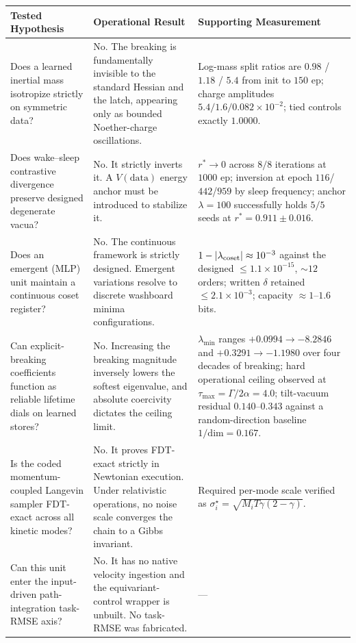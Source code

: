 \documentclass{article}
\begin{document}
\begin{center}
\begin{tabular}{@{}p{1.52in} p{1.52in} p{2.06in}@{}}
\toprule
Tested Hypothesis & Operational Result & Supporting Measurement \\
\midrule
Does a learned inertial mass isotropize strictly on symmetric data? &
No. The breaking is fundamentally invisible to the standard Hessian and the latch, appearing only as bounded Noether-charge oscillations. &
Log-mass split ratios are $0.98$ / $1.18$ / $5.4$ from init to $150$ ep; charge amplitudes $5.4/1.6/0.082{\times}10^{-2}$; tied controls exactly $1.0000$. \\[2pt]
Does wake--sleep contrastive divergence preserve designed degenerate vacua? &
No. It strictly inverts it. A $V(\text{data})$ energy anchor must be introduced to stabilize it. &
$r^*\to0$ across $8/8$ iterations at $1000$ ep; inversion at epoch $116$/$442$/$959$ by sleep frequency; anchor $\lambda{=}100$ successfully holds $5/5$ seeds at $r^*{=}0.911\pm0.016$. \\[2pt]
Does an emergent (MLP) unit maintain a continuous coset register? &
No. The continuous framework is strictly designed. Emergent variations resolve to discrete washboard minima configurations. &
$1-|\lambda_{\rm coset}|\approx10^{-3}$ against the designed $\le1.1{\times}10^{-15}$, $\sim\!12$ orders; written $\delta$ retained $\le2.1{\times}10^{-3}$; capacity $\approx1$--$1.6$ bits. \\[2pt]
Can explicit-breaking coefficients function as reliable lifetime dials on learned stores? &
No. Increasing the breaking magnitude inversely lowers the softest eigenvalue, and absolute coercivity dictates the ceiling limit. &
$\lambda_{\min}$ ranges $+0.0994\to-8.2846$ and $+0.3291\to-1.1980$ over four decades of breaking; hard operational ceiling observed at $\tau_{\max}=\Gamma/2\alpha=4.0$; tilt-vacuum residual $0.140$--$0.343$ against a random-direction baseline $1/\mathrm{dim}=0.167$. \\[2pt]
Is the coded momentum-coupled Langevin sampler FDT-exact across all kinetic modes? &
No. It proves FDT-exact strictly in Newtonian execution. Under relativistic operations, no noise scale converges the chain to a Gibbs invariant. &
Required per-mode scale verified as $\sigma^\star_i=\sqrt{M_iT\gamma(2-\gamma)}$. \\[2pt]
Can this unit enter the input-driven path-integration task-RMSE axis? &
No. It has no native velocity ingestion and the equivariant-control wrapper is unbuilt. No task-RMSE was fabricated. &
--- \\[2pt]
\bottomrule
\end{tabular}
\end{center}
\end{document}
